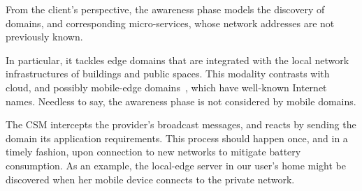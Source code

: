 From the client's perspective, the awareness phase models the discovery of domains, and corresponding micro-services, whose network addresses are not previously known. 

In particular, it tackles edge domains that are integrated with the local network infrastructures of buildings and public spaces. This modality contrasts with cloud, and possibly mobile-edge domains~\cite{ahmed2016isco}, which have well-known Internet names. Needless to say, the awareness phase is not considered by mobile domains.

The CSM intercepts the provider's broadcast messages, and reacts by sending the domain its application requirements. This process should happen once, and in a timely fashion, upon connection to new networks to mitigate battery consumption. As an example, the local-edge server in our user's home might be discovered when her mobile device connects to the private network. 







%


%
%
	
